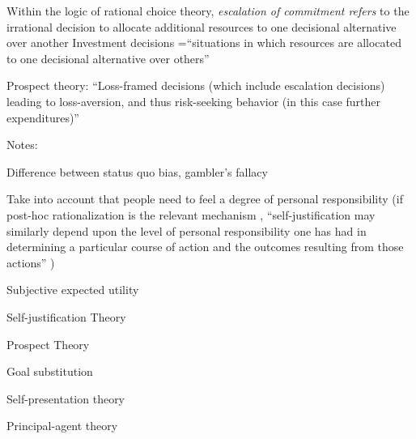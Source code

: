 

Within the logic of rational choice theory, \textit{escalation of commitment refers} to the irrational decision to allocate additional  resources to one decisional alternative over another 
Investment decisions =\enquote{situations in which resources are allocated to one decisional alternative over others} \parencite[p. 28]{Staw1976}


Prospect theory: \enquote{Loss-framed decisions (which include escalation decisions) leading to loss-aversion, and thus risk-seeking behavior (in this case further expenditures)} \parencite[][p. 544]{Sleesman2012}




Notes:

Difference between status quo bias, gambler's fallacy

Take into account that people need to feel a degree of personal responsibility (if post-hoc rationalization is the relevant mechanism , \enquote{self-justification  may similarly depend upon the level of personal responsibility one has had in determining a particular course of action and the outcomes resulting from those actions} ) \parencite[][p. 30]{Staw1976}

Subjective expected utility


Self-justification Theory


Prospect Theory


Goal substitution


Self-presentation theory 



Principal-agent theory
